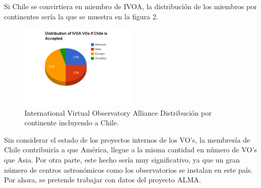 Si Chile se convirtiera en miembro de IVOA, la distribución de los miembros
por continentes sería la que se muestra en la figura 2.
	\begin{figure}[h!t]
		\begin{center}
			\includegraphics[width=0.5\textwidth]{img/if_chile_is_accepted.png}
			\caption{International Virtual Observatory Alliance Distribución por continente incluyendo a Chile.}
		\end{center}
	\end{figure}

Sin considerar el estado de los proyectos internos de los VO's, 
la membresía de Chile contribuiría a que América, llegue a la misma
cantidad en número de VO's que Asia. Por otra parte, este
hecho sería muy significativo, ya que un gran número de centros astronómicos
como los observatorios se instalan en este país. Por ahora, se pretende
trabajar con datos del proyecto ALMA.
